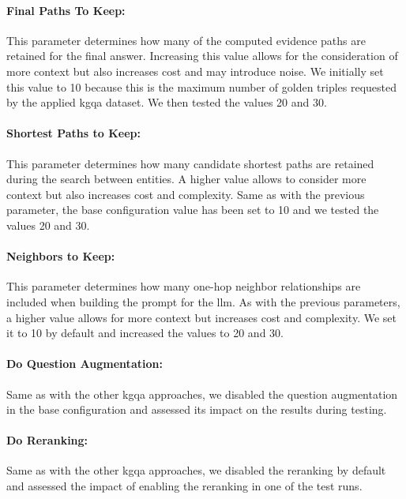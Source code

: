 \paragraph{Final Paths To Keep:} This parameter determines how many of the computed evidence paths are retained for the final answer. Increasing this value allows for the consideration of more context but also increases cost and may introduce noise. We initially set this value to 10 because this is the maximum number of golden triples requested by the applied \gls{kgqa} dataset. We then tested the values 20 and 30.

\paragraph{Shortest Paths to Keep:} This parameter determines how many candidate shortest paths are retained during the search between entities. A higher value allows to consider more context but also increases cost and complexity. Same as with the previous parameter, the base configuration value has been set to 10 and we tested the values 20 and 30.

\paragraph{Neighbors to Keep:} This parameter determines how many one-hop neighbor relationships are included when building the prompt for the \gls{llm}. As with the previous parameters, a higher value allows for more context but increases cost and complexity. We set it to 10 by default and increased the values to 20 and 30.

\paragraph{Do Question Augmentation:} Same as with the other \gls{kgqa} approaches, we disabled the question augmentation in the base configuration and assessed its impact on the results during
testing.

\paragraph{Do Reranking:} Same as with the other \gls{kgqa} approaches, we disabled the reranking by default and assessed the impact of enabling the reranking in one of the test runs.

